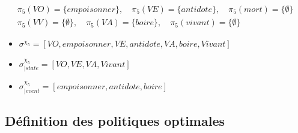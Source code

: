 \documentclass[11pt]{extarticle}
\begin{document}
\begin{itemize}
     \begin{minipage}{0.3\textwidth}
        \begin{align*}
            &\pi_5(VO)= \{empoisonner\}, \quad \pi_5(VE)= \{antidote\}, \quad \pi_5(mort)=\{\emptyset\} \quad \\ 
            &\pi_5(VV) = \{\emptyset\},\quad \pi_5(VA) = \{boire\},\quad \pi_5(vivant)=\{\emptyset\}
        \end{align*}
         \begin{itemize}
             \item $\sigma^{\chi_5}= [VO,empoisonner,VE,antidote,VA,boire,Vivant]$ 
             \item  $\sigma^{\chi_5}_{|state}=[VO,VE,VA,Vivant]$
             \item $\sigma^{\chi_5}_{|event}=[empoisonner,antidote,boire]$
         \end{itemize}         
     \end{minipage}
     \begin{minipage}{0.45\textwidth}
     \end{minipage}
\end{itemize}

\subsection{Définition des politiques optimales}
\end{document}
